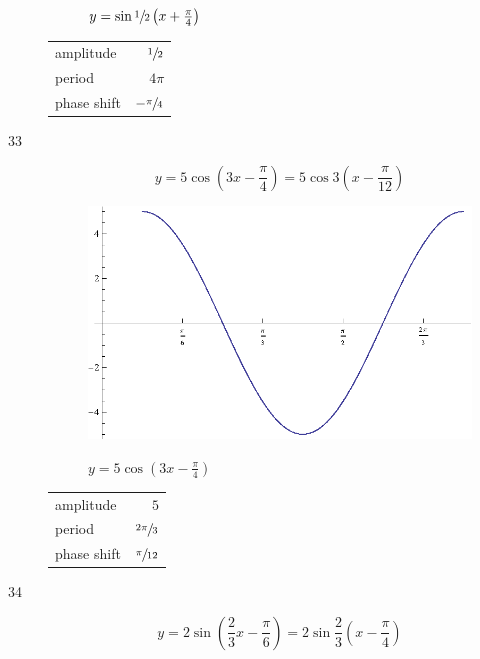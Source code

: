 \documentclass{exam}
\begin{document}
\begin{description}
\begin{figure}[H]
          $y = \sin \sfrac{1}{2} \left( x + \frac{\pi}{4} \right)$
        \end{figure}

        \begin{tabular}[H]{lr}
          \toprule
          amplitude   & $\sfrac{1}{2}$ \\
          period      & $4 \pi$ \\
          phase shift & $- \sfrac{\pi}{4}$ \\
          \bottomrule
        \end{tabular}

      \item[33]
        \[
          y = 5 \cos \left( 3x - \frac{\pi}{4} \right) = 5 \cos 3 \left( x - \frac{\pi}{12} \right)
        \]

        \begin{figure}[H]
          \centering
          \includegraphics[scale=0.8]{exercise33.eps}

          $y = 5 \cos \left( 3x - \frac{\pi}{4} \right)$
        \end{figure}

        \begin{tabular}[H]{lr}
          \toprule
          amplitude   & $5$ \\
          period      & $\sfrac{2 \pi}{3}$ \\
          phase shift & $\sfrac{\pi}{12}$ \\
          \bottomrule
        \end{tabular}

      \pagebreak

      \item[34]
        \[
          y = 2 \sin \left( \frac{2}{3} x - \frac{\pi}{6} \right) = 2 \sin \frac{2}{3} \left( x - \frac{\pi}{4} \right)
        \]


\end{description}
\end{document}
